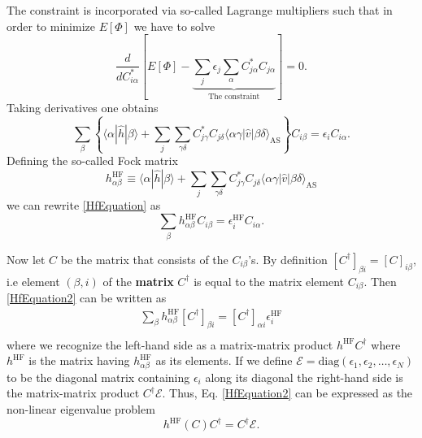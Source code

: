 \documentclass[a4paper,10pt]{article}
\newcommand{\braket}[1]{\langle#1\rangle}
\theoremstyle{definition}
\begin{document}
The constraint is incorporated via so-called Lagrange multipliers such that in order to minimize $E[\Phi]$ we have to solve 
\begin{equation}
 \frac{d}{d C^*_{i \alpha}} \left[ E[\Phi] - \underbrace{\sum_j \epsilon_j \sum_\alpha C^*_{j \alpha} C_{j \alpha}}_\text{The constraint} \right] = 0.
\end{equation}
Taking derivatives one obtains 
\begin{equation}
 \sum_\beta \left\{\braket{\alpha|\hat{h}|\beta} + \sum_j \sum_{\gamma \delta} C^*_{j \gamma} C_{j \delta} \braket{\alpha \gamma | \hat{v} | \beta \delta}_\text{AS} \right\}C_{i \beta} = \epsilon_i C_{i \alpha} \label{HfEquation}.
\end{equation}
Defining the so-called Fock matrix  
\begin{equation}
 h_{\alpha \beta}^{\text{HF}} \equiv \braket{\alpha|\hat{h}|\beta} + \sum_j \sum_{\gamma \delta} C^*_{j \gamma} C_{j \delta} \braket{\alpha \gamma | \hat{v} | \beta \delta}_\text{AS}
\end{equation}
we can rewrite \ref{HfEquation} as
\begin{equation}
 \sum_{\beta} h_{\alpha \beta}^{\text{HF}} C_{i \beta} = \epsilon_i^{\text{HF}} C_{i \alpha} \label{HfEquation2}.
\end{equation}

Now let $C$ be the matrix that consists of the $C_{i \beta}$'s. By definition $[C^\dagger]_{\beta i} = [C]_{i \beta}$, 
i.e element $(\beta,i)$ of the \textbf{matrix} $C^\dagger$ is equal to the matrix element $C_{i \beta}$.
Then \ref{HfEquation2} can be written as 
\begin{align}
 \sum_{\beta} h_{\alpha \beta}^{\text{HF}} [C^\dagger]_{\beta i} = [C^\dagger]_{\alpha i}\epsilon_i^{\text{HF}} \\
\end{align}
where we recognize the left-hand side as a matrix-matrix product $h^\text{HF} C^\dagger$ where $h^\text{HF}$ is the matrix 
having $h_{\alpha \beta}^{\text{HF}}$ as its elements. If we define 
$\mathcal{E} = \text{diag}(\epsilon_1,\epsilon_2,\dots,\epsilon_N)$ to be the diagonal matrix containing $\epsilon_i$ along its diagonal 
the right-hand side is the matrix-matrix product $C^\dagger \mathcal{E}$. Thus, Eq. \ref{HfEquation2} can be expressed as the 
non-linear eigenvalue problem 
\begin{equation}
 h^\text{HF}(C) C^\dagger = C^\dagger \mathcal{E}.
\end{equation}
\end{document}
